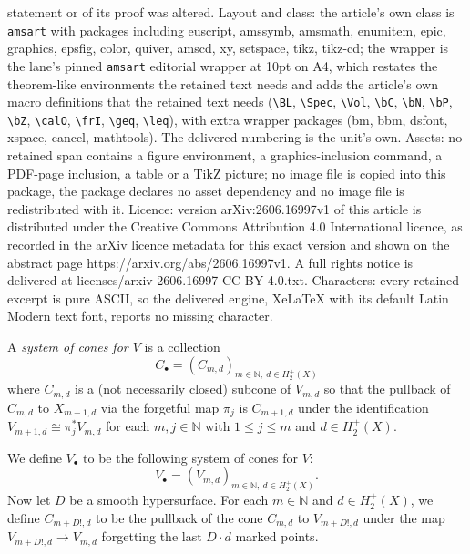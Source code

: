 \documentclass[10pt,a4paper]{amsart}
\newcommand{\bN}{\mathbb{N}}
\renewcommand{\leq}{\leqslant}
\begin{document}
statement or of its proof was altered. Layout and class: the article's own class is \texttt{amsart} with packages including euscript, amssymb, amsmath, enumitem, epic, graphics, epsfig, color, quiver, amscd, xy, setspace, tikz, tikz-cd; the wrapper is the lane's pinned \texttt{amsart} editorial wrapper at 10pt on A4, which restates the theorem-like environments the retained text needs and adds the article's own macro definitions that the retained text needs (\texttt{\textbackslash BL}, \texttt{\textbackslash Spec}, \texttt{\textbackslash Vol}, \texttt{\textbackslash bC}, \texttt{\textbackslash bN}, \texttt{\textbackslash bP}, \texttt{\textbackslash bZ}, \texttt{\textbackslash calO}, \texttt{\textbackslash frI}, \texttt{\textbackslash geq}, \texttt{\textbackslash leq}), with extra wrapper packages (bm, bbm, dsfont, xspace, cancel, mathtools). The delivered numbering is the unit's own. Assets: no retained span contains a figure environment, a graphics-inclusion command, a PDF-page inclusion, a table or a TikZ picture; no image file is copied into this package, the package declares no asset dependency and no image file is redistributed with it. Licence: version arXiv:2606.16997v1 of this article is distributed under the Creative Commons Attribution 4.0 International licence, as recorded in the arXiv licence metadata for this exact version and shown on the abstract page https://arxiv.org/abs/2606.16997v1. A full rights notice is delivered at licenses/arxiv-2606.16997-CC-BY-4.0.txt. Characters: every retained excerpt is pure ASCII, so the delivered engine, XeLaTeX with its default Latin Modern text font, reports no missing character.
\begin{defn} \label{defnsystemofcones}
	A \emph{system of cones for $V$} is a collection
	\begin{equation}
		C_\bullet = (C_{m,d})_{m \in \bN, \ d \in H_2^+(X)}
	\end{equation}
	where $C_{m,d}$ is a (not necessarily closed) subcone of $V_{m,d}$ so that the pullback of $C_{m,d}$ to $X_{m+1,d}$ via the forgetful map $\pi_j$ is $C_{m+1,d}$
	under the identification $V_{m+1,d} \cong \pi_j^*V_{m,d}$ for each $m,j \in \bN$ with $1 \leq j \leq m$ and $d \in H_2^+(X)$.



	We define $V_\bullet$ to be the following system of cones for $V$:
	\begin{equation}
		V_\bullet = (V_{m,d})_{m \in \bN, \ d \in H_2^+(X)}.
	\end{equation}
	Now let $D$ be a smooth hypersurface.
	For each $m \in \bN$ and $d \in H_2^+(X)$,
	we define $C_{m+D!,d}$ to be the pullback of the cone $C_{m,d}$ to $V_{m+D!,d}$
	under the map $V_{m+D!,d} \to V_{m,d}$ forgetting the last $D \cdot d$ marked points.
\end{defn}
\end{document}
